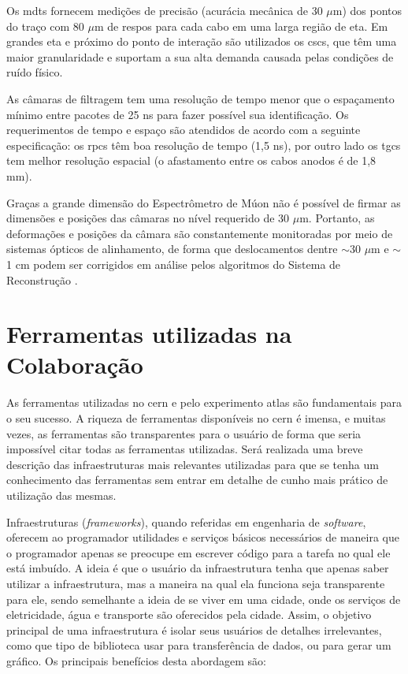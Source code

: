 Os \glspl{mdt} fornecem medições de precisão (acurácia mecânica de 30 $\mu$m) 
dos pontos do traço com 80 $\mu$m de \gls{respos}
para cada cabo em uma larga região de \gls{eta}. Em grandes \gls{eta} e próximo
do ponto de interação são utilizados os \glspl{csc}, que têm uma maior
granularidade e suportam a sua alta demanda causada pelas condições de ruído
físico.
 
As câmaras de filtragem tem uma resolução de tempo menor que o espaçamento
mínimo entre pacotes de 25 ns para fazer possível sua identificação. Os
requerimentos de tempo e espaço são atendidos de acordo com a seguinte
especificação: os \glspl{rpc} têm boa resolução de tempo (1,5 ns), por outro
lado os \glspl{tgc} tem melhor resolução espacial 
(o afastamento entre os cabos anodos é de 1,8 mm).

Graças a grande dimensão do Espectrômetro de Múon não é possível de firmar as
dimensões e posições das câmaras no nível requerido de 30 $\mu$m. Portanto, as
deformações e posições da câmara são constantemente monitoradas por meio de
sistemas ópticos de alinhamento, de forma que deslocamentos dentre $\sim$30
$\mu$m e $\sim$1 cm podem ser corrigidos em análise pelos algoritmos do
Sistema de Reconstrução \cite{muon_tdr}.

\section{Ferramentas utilizadas na Colaboração}
\label{sec:ferramentas}

As ferramentas utilizadas no \gls{cern} e pelo experimento \gls{atlas} são
fundamentais para o seu sucesso. A riqueza de ferramentas disponíveis
no \gls{cern} é imensa, e muitas vezes, as ferramentas são
transparentes para o usuário de forma que seria impossível citar todas as 
ferramentas utilizadas. Será realizada uma breve descrição das infraestruturas 
mais relevantes utilizadas para que se tenha um conhecimento das ferramentas 
sem entrar em detalhe de cunho mais prático de utilização das mesmas.

Infraestruturas \cite{root} (\emph{frameworks}), 
quando referidas em engenharia de \emph{software},
oferecem ao programador utilidades e serviços básicos necessários de maneira que
o programador apenas se preocupe em escrever código para a tarefa no qual ele
está imbuído. A ideia é que o usuário da infraestrutura tenha que apenas saber
utilizar a infraestrutura, mas a maneira na qual ela funciona seja transparente
para ele, sendo semelhante a ideia de se viver em uma cidade, onde os serviços
de eletricidade, água e transporte são oferecidos pela cidade. Assim, o objetivo
principal de uma infraestrutura é isolar seus usuários de detalhes irrelevantes,
como que tipo de biblioteca usar para transferência de dados, ou para gerar um
gráfico. Os principais benefícios desta abordagem são:

